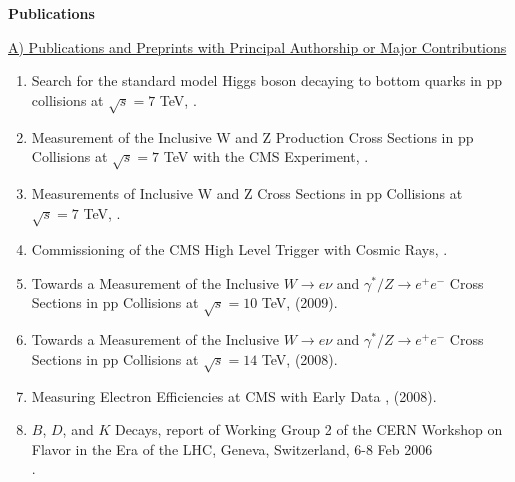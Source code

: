 \documentclass [12pt]{report}
\begin{document}
\clearpage
\newpage

\begin{center} \Large {\bf Publications} \vspace*{5mm}\\  
\end{center} 


\noindent\underline{A) Publications and Preprints with Principal
Authorship or Major Contributions}

\begin{enumerate}

CMS publications

\item Search for the standard model Higgs boson decaying to bottom quarks in pp collisions at $\sqrt{s}=7$ TeV, .

\item Measurement of the Inclusive W and Z Production Cross Sections in pp Collisions at $\sqrt{s} = 7$ TeV with the CMS Experiment, .

\item Measurements of Inclusive W and Z Cross Sections in pp Collisions at $\sqrt{s} = 7$ TeV, .

\item Commissioning of the CMS High Level Trigger with Cosmic Rays, .

\item Towards a Measurement of the Inclusive $W\rightarrow e\nu$ and
$\gamma^* /Z \rightarrow e^+e^−$ Cross Sections in pp Collisions at $\sqrt{s} = 10$
TeV,
 (2009).

\item Towards a Measurement of the Inclusive $W\rightarrow e\nu$ and
$\gamma^* /Z \rightarrow e^+e^−$ Cross Sections in pp Collisions at $\sqrt{s} = 14$
TeV,
 (2008).

\item Measuring Electron Efficiencies at CMS with Early Data ,
 (2008).

\item $B$, $D$, and $K$ Decays, report of Working Group 2 of the CERN Workshop on Flavor in the Era of the LHC, Geneva, Switzerland, 6-8 Feb 2006\\
.

\end{enumerate}
\end{document}
